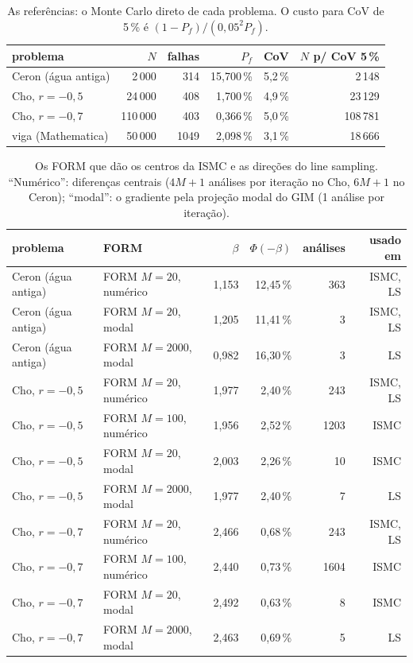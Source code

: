 \begin{table}[H]\centering\small
\caption{As referências: o Monte Carlo direto de cada problema. O custo para CoV de 5\,\% é $(1 - P_f)/(0{,}05^2 P_f)$.}\label{tab:ref}
\begin{tabular}{lrrrrr}\toprule
problema & $N$ & falhas & $P_f$ & CoV & $N$ p/ CoV 5\,\% \\\midrule
Ceron (água antiga) & 2\,000 & 314 & 15,700\,\% & 5,2\,\% & 2\,148 \\
Cho, $r = -0{,}5$ & 24\,000 & 408 & 1,700\,\% & 4,9\,\% & 23\,129 \\
Cho, $r = -0{,}7$ & 110\,000 & 403 & 0,366\,\% & 5,0\,\% & 108\,781 \\
viga (Mathematica) & 50\,000 & 1049 & 2,098\,\% & 3,1\,\% & 18\,666 \\
\bottomrule\end{tabular}\end{table}

\begin{table}[H]\centering\small
\caption{Os FORM que dão os centros da ISMC e as direções do line sampling. ``Numérico'': diferenças centrais ($4M + 1$ análises por iteração no Cho, $6M + 1$ no Ceron); ``modal'': o gradiente pela projeção modal do GIM (1 análise por iteração).}\label{tab:form}
\begin{tabular}{llrrrr}\toprule
problema & FORM & $\beta$ & $\Phi(-\beta)$ & análises & usado em \\\midrule
Ceron (água antiga) & FORM $M = 20$, numérico & 1,153 & 12,45\,\% & 363 & ISMC, LS \\
Ceron (água antiga) & FORM $M = 20$, modal & 1,205 & 11,41\,\% & 3 & ISMC, LS \\
Ceron (água antiga) & FORM $M = 2000$, modal & 0,982 & 16,30\,\% & 3 & LS \\
Cho, $r = -0{,}5$ & FORM $M = 20$, numérico & 1,977 & 2,40\,\% & 243 & ISMC, LS \\
Cho, $r = -0{,}5$ & FORM $M = 100$, numérico & 1,956 & 2,52\,\% & 1203 & ISMC \\
Cho, $r = -0{,}5$ & FORM $M = 20$, modal & 2,003 & 2,26\,\% & 10 & ISMC \\
Cho, $r = -0{,}5$ & FORM $M = 2000$, modal & 1,977 & 2,40\,\% & 7 & LS \\
Cho, $r = -0{,}7$ & FORM $M = 20$, numérico & 2,466 & 0,68\,\% & 243 & ISMC, LS \\
Cho, $r = -0{,}7$ & FORM $M = 100$, numérico & 2,440 & 0,73\,\% & 1604 & ISMC \\
Cho, $r = -0{,}7$ & FORM $M = 20$, modal & 2,492 & 0,63\,\% & 8 & ISMC \\
Cho, $r = -0{,}7$ & FORM $M = 2000$, modal & 2,463 & 0,69\,\% & 5 & LS \\
\bottomrule\end{tabular}\end{table}

